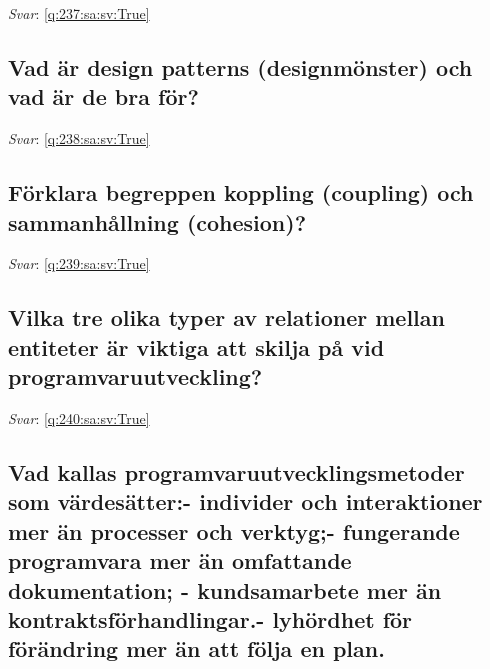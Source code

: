 \documentclass[a4paper,11pt,oneside]{article}
\begin{document}
\begin{sloppypar}
\noindent\makebox[\textwidth]{\hrulefill}

\vspace{1cm}

\textit{Svar}: \autoref{q:237:sa:sv:True}



\subsection{Vad \"ar design patterns (designm\"onster) och vad \"ar de bra f\"or?}

\label{q:238:sa:sv:False}

\vspace{2cm}

\noindent\makebox[\textwidth]{\hrulefill}

\vspace{1cm}

\textit{Svar}: \autoref{q:238:sa:sv:True}



\subsection{F\"orklara begreppen koppling (coupling) och sammanh\r{a}llning (cohesion)?}

\label{q:239:sa:sv:False}

\vspace{2cm}

\noindent\makebox[\textwidth]{\hrulefill}

\vspace{1cm}

\textit{Svar}: \autoref{q:239:sa:sv:True}



\subsection{Vilka tre olika typer av relationer mellan entiteter \"ar viktiga att skilja p\r{a} vid programvaruutveckling?}

\label{q:240:sa:sv:False}

\vspace{2cm}

\noindent\makebox[\textwidth]{\hrulefill}

\vspace{1cm}

\textit{Svar}: \autoref{q:240:sa:sv:True}



\subsection{Vad kallas programvaruutvecklingsmetoder som v\"ardes\"atter:- individer och interaktioner mer \"an processer och verktyg;- fungerande programvara mer \"an omfattande dokumentation; - kundsamarbete mer \"an kontraktsf\"orhandlingar.- lyh\"ordhet f\"or f\"or\"andring mer \"an att f\"olja en plan.}


\end{sloppypar}
\end{document}

